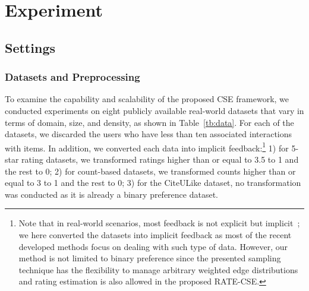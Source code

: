 \documentclass[sigconf,anonymous=false]{acmart}
\begin{document}
\section{Experiment}\label{sec:exp}

\subsection{Settings}

\subsubsection{Datasets and Preprocessing}
To examine the capability and scalability of the proposed CSE framework, we
conducted experiments on eight publicly available real-world datasets that vary
in terms of domain, size, and density, as shown in Table~\ref{tb:data}.
For each of the datasets, we discarded the users who have less than ten
associated interactions with items.
In addition, we converted each data into implicit feedback:\footnote{Note that
  in real-world scenarios, most feedback is not explicit but
  implicit~\cite{bpr}; we here converted the datasets into implicit feedback as
  most of the recent developed methods focus on dealing with such type of data.
  However, our method is not limited to binary preference since the presented
  sampling technique has the flexibility to manage arbitrary weighted edge
  distributions and rating estimation is also allowed in the
  proposed RATE-CSE.}
  1) for 5-star rating datasets, we transformed ratings higher than or equal to
  3.5 to 1 and the rest to 0; 2) for count-based datasets, we transformed
  counts higher than or equal to 3 to 1 and the rest to 0; 3) for the CiteULike
  dataset, no transformation was conducted as it is already a binary preference
  dataset.
\end{document}
